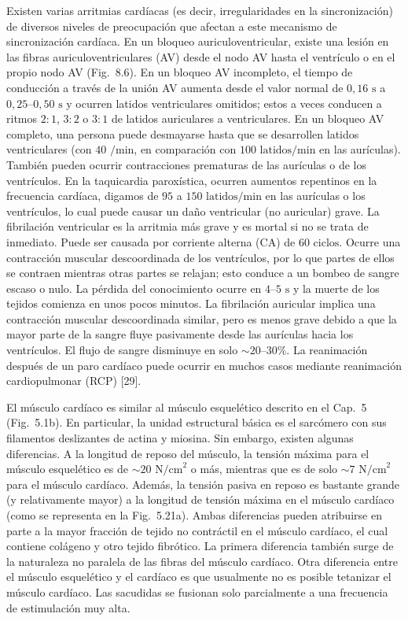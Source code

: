 \documentclass[12pt]{book}
\begin{document}
Existen varias arritmias cardíacas (es decir, irregularidades en la sincronización) de diversos niveles de preocupación que afectan a este mecanismo de sincronización cardíaca. En un bloqueo auriculoventricular, existe una lesión en las fibras auriculoventriculares (AV) desde el nodo AV hasta el ventrículo o en el propio nodo AV (Fig.~8.6). En un bloqueo AV incompleto, el tiempo de conducción a través de la unión AV aumenta desde el valor normal de $0{,}16\text{ s}$ a $0{,}25\text{--}0{,}50\text{ s}$ y ocurren latidos ventriculares omitidos; estos a veces conducen a ritmos $2:1$, $3:2$ o $3:1$ de latidos auriculares a ventriculares. En un bloqueo AV completo, una persona puede desmayarse hasta que se desarrollen latidos ventriculares (con $40\text{ /min}$, en comparación con $100\text{ latidos/min}$ en las aurículas). También pueden ocurrir contracciones prematuras de las aurículas o de los ventrículos. En la taquicardia paroxística, ocurren aumentos repentinos en la frecuencia cardíaca, digamos de $95$ a $150\text{ latidos/min}$ en las aurículas o los ventrículos, lo cual puede causar un daño ventricular (no auricular) grave. La fibrilación ventricular es la arritmia más grave y es mortal si no se trata de inmediato. Puede ser causada por corriente alterna (CA) de $60\text{ ciclos}$. Ocurre una contracción muscular descoordinada de los ventrículos, por lo que partes de ellos se contraen mientras otras partes se relajan; esto conduce a un bombeo de sangre escaso o nulo. La pérdida del conocimiento ocurre en $4\text{--}5\text{ s}$ y la muerte de los tejidos comienza en unos pocos minutos. La fibrilación auricular implica una contracción muscular descoordinada similar, pero es menos grave debido a que la mayor parte de la sangre fluye pasivamente desde las aurículas hacia los ventrículos. El flujo de sangre disminuye en solo ${\sim}20\text{--}30\%$. La reanimación después de un paro cardíaco puede ocurrir en muchos casos mediante reanimación cardiopulmonar (RCP) [29].

El músculo cardíaco es similar al músculo esquelético descrito en el Cap.~5 (Fig.~5.1b). En particular, la unidad estructural básica es el sarcómero con sus filamentos deslizantes de actina y miosina. Sin embargo, existen algunas diferencias. A la longitud de reposo del músculo, la tensión máxima para el músculo esquelético es de ${\sim}20\text{ N/cm}^2$ o más, mientras que es de solo ${\sim}7\text{ N/cm}^2$ para el músculo cardíaco. Además, la tensión pasiva en reposo es bastante grande (y relativamente mayor) a la longitud de tensión máxima en el músculo cardíaco (como se representa en la Fig.~5.21a). Ambas diferencias pueden atribuirse en parte a la mayor fracción de tejido no contráctil en el músculo cardíaco, el cual contiene colágeno y otro tejido fibrótico. La primera diferencia también surge de la naturaleza no paralela de las fibras del músculo cardíaco. Otra diferencia entre el músculo esquelético y el cardíaco es que usualmente no es posible tetanizar el músculo cardíaco. Las sacudidas se fusionan solo parcialmente a una frecuencia de estimulación muy alta.
\end{document}
